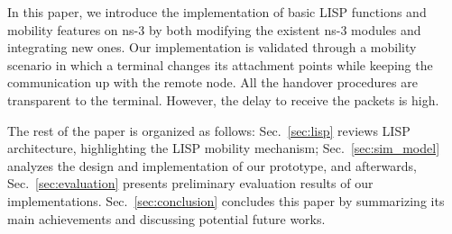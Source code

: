 In this paper, we introduce the implementation of basic LISP functions and
mobility features on ns-3 by both modifying the existent ns-3 modules and
integrating new ones. Our implementation is validated through a mobility
scenario in which a terminal changes its attachment points while keeping the
communication up with the remote node. All the handover procedures are
transparent to the terminal.  However, the delay to receive the packets is high.


The rest of the paper is organized as follows: Sec.~\ref{sec:lisp} reviews LISP
architecture, highlighting the LISP mobility mechanism; Sec.~\ref{sec:sim_model}
analyzes the design and implementation of our prototype, and afterwards,
Sec.~\ref{sec:evaluation} presents preliminary evaluation results of our
implementations. Sec.~\ref{sec:conclusion} concludes this paper by summarizing
its main achievements and discussing potential future works.
